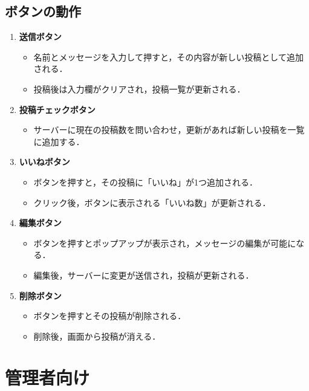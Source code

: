 \documentclass[uplatex,dvipdfmx]{jsarticle}
\begin{document}
\subsection*{ボタンの動作}
\begin{enumerate}
  \item \textbf{送信ボタン}
    \begin{itemize}
      \item 名前とメッセージを入力して押すと，その内容が新しい投稿として追加される．
      \item 投稿後は入力欄がクリアされ，投稿一覧が更新される．
    \end{itemize}

  \item \textbf{投稿チェックボタン}
    \begin{itemize}
      \item サーバーに現在の投稿数を問い合わせ，更新があれば新しい投稿を一覧に追加する．
    \end{itemize}

  \item \textbf{いいねボタン}
    \begin{itemize}
      \item ボタンを押すと，その投稿に「いいね」が1つ追加される．
      \item クリック後，ボタンに表示される「いいね数」が更新される．
    \end{itemize}

  \item \textbf{編集ボタン}
    \begin{itemize}
      \item ボタンを押すとポップアップが表示され，メッセージの編集が可能になる．
      \item 編集後，サーバーに変更が送信され，投稿が更新される．
    \end{itemize}

  \item \textbf{削除ボタン}
    \begin{itemize}
      \item ボタンを押すとその投稿が削除される．
      \item 削除後，画面から投稿が消える．
    \end{itemize}
\end{enumerate}


\section{管理者向け}
\end{document}
